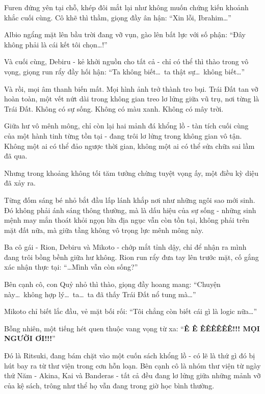 \documentclass[../main.tex]{subfiles}
\begin{document}
Furen đứng yên tại chỗ, khép đôi mắt lại như không muốn chứng kiến khoảnh khắc cuối cùng. Cô khẽ thì thầm, giọng đầy ân hận: ``Xin lỗi, Ibrahim\dots''

Albio ngẩng mặt lên bầu trời đang vỡ vụn, gào lên bất lực với số phận: ``Đây không phải là cái kết tôi chọn\dots!''

Và cuối cùng, Debiru - kẻ khởi nguồn cho tất cả - chỉ có thể thì thào trong vô vọng, giọng run rẩy đầy hối hận: ``Ta không biết\dots\ ta thật sự\dots\ không biết\dots''

Và rồi, mọi âm thanh biến mất.
Mọi hình ảnh trở thành tro bụi.
Trái Đất tan vỡ hoàn toàn, một vết nứt dài trong không gian treo lơ lửng giữa vũ trụ, nơi từng là Trái Đất. Không có sự sống. Không có màu xanh. Không có mây trời.

Giữa hư vô mênh mông, chỉ còn lại hai mảnh đá khổng lồ - tàn tích cuối cùng của một hành tinh từng tồn tại - đang trôi lơ lửng trong không gian vô tận. Không một ai có thể đảo ngược thời gian, không một ai có thể sửa chữa sai lầm đã qua.

Nhưng trong khoảng không tối tăm tưởng chừng tuyệt vọng ấy, một điều kỳ diệu đã xảy ra.

Từng đốm sáng bé nhỏ bắt đầu lấp lánh khắp nơi như những ngôi sao mới sinh. Đó không phải ánh sáng thông thường, mà là dấu hiệu của sự sống - những sinh mệnh may mắn thoát khỏi ngọn lửa địa ngục vẫn còn tồn tại, không phải trên mặt đất nữa, mà giữa tầng không vô trọng lực mênh mông này.

Ba cô gái - Rion, Debiru và Mikoto - chớp mắt tỉnh dậy, chỉ để nhận ra mình đang trôi bồng bềnh giữa hư không. Rion run rẩy đưa tay lên trước mặt, cố gắng xác nhận thực tại: ``\dots Mình vẫn còn sống?''

Bên cạnh cô, con Quỷ nhỏ thì thào, giọng đầy hoang mang: ``Chuyện này\dots\ không hợp lý\dots\ ta\dots\ ta đã thấy Trái Đất nổ tung mà\dots''

Mikoto chỉ biết lắc đầu, vẻ mặt bối rối: ``Tôi chẳng còn biết cái gì là logic nữa\dots''

Bỗng nhiên, một tiếng hét quen thuộc vang vọng từ xa: ``\textbf{Ê Ê ÊÊÊÊÊÊ!!! MỌI NGƯỜI ƠI!!!}''

Đó là Ritsuki, đang bám chặt vào một cuốn sách khổng lồ - có lẽ là thứ gì đó bị hút bay ra từ thư viện trong cơn hỗn loạn. Bên cạnh cô là nhóm thư viện từ ngày thứ Năm - Akina, Kai và Banderas - tất cả đều đang lơ lửng giữa những mảnh vỡ của kệ sách, trông như thể họ vẫn đang trong giờ học bình thường.
\end{document}
